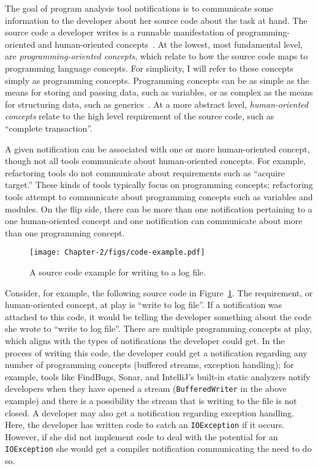 The goal of program analysis tool notifications is to communicate some information to the developer about her source code about the task at hand.
The source code a developer writes is a runnable manifestation of programming-oriented and human-oriented concepts~\cite{van2004concepts,biggerstaff1994program}. 
At the lowest, most fundamental level, are \emph{programming-oriented concepts}, which relate to how the source code maps to programming language concepts. For simplicity, I will refer to these concepts simply as programming concepts.
Programming concepts can be as simple as the means for storing and passing data, such as variables, or as complex as the means for structuring data, such as generics~\cite{jazayeri1997programming}.
At a more abstract level, \emph{human-oriented concepts} relate to the high level requirement of the source code, such as ``complete transaction''.

A given notification can be associated with one or more human-oriented concept, though not all tools communicate about human-oriented concepts. For example, refactoring tools do not communicate about requirements such as ``acquire target.'' These kinds of tools typically focus on programming concepts; refactoring tools attempt to communicate about programming concepts such as variables and modules.
On the flip side, there can be more than one notification pertaining to a one human-oriented concept and one notification can communicate about more than one programming concept. 

\begin{figure} [ht]
	\centering
	\texttt{[image: Chapter-2/figs/code-example.pdf]}
	\caption{A source code example for writing to a log file.}
	\label{fig:code}
\end{figure}

Consider, for example, the following source code in Figure~\ref{fig:code}. The requirement, or human-oriented concept, at play is ``write to log file''. If a notification was attached to this code, it would be telling the developer something about the code she wrote to ``write to log file''.
There are multiple programming concepts at play, which aligns with the types of notifications the developer could get. 
In the process of writing this code, the developer could get a notification regarding any number of programming concepts (buffered streams, exception handling); for example, tools like FindBugs, Sonar, and IntelliJ's built-in static analyzers notify developers when they have opened a stream (\texttt{BufferedWriter} in the above example) and there is a possibility the stream that is writing to the file is not closed.
A developer may also get a notification regarding exception handling. Here, the developer has written code to catch an \texttt{IOException} if it occurs. However, if she did not implement code to deal with the potential for an \texttt{IOException} she would get a compiler notification communicating the need to do so.


